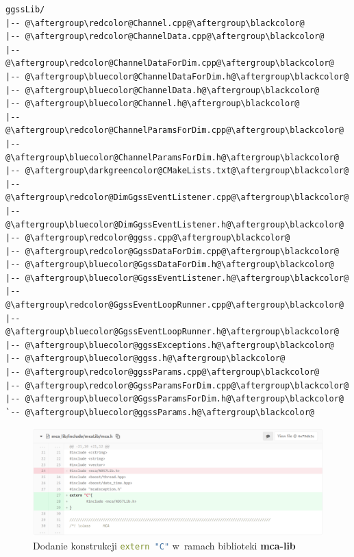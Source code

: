 \begin{multicols*}{2}[]
\begin{lstlisting}[title={(b) Pierwotna struktura biblioteki \textbf{ggss-lib}}, label={lst:oldLibStructure}, escapechar=@]
ggssLib/
|-- @\aftergroup\redcolor@Channel.cpp@\aftergroup\blackcolor@
|-- @\aftergroup\redcolor@ChannelData.cpp@\aftergroup\blackcolor@
|-- @\aftergroup\redcolor@ChannelDataForDim.cpp@\aftergroup\blackcolor@
|-- @\aftergroup\bluecolor@ChannelDataForDim.h@\aftergroup\blackcolor@
|-- @\aftergroup\bluecolor@ChannelData.h@\aftergroup\blackcolor@
|-- @\aftergroup\bluecolor@Channel.h@\aftergroup\blackcolor@
|-- @\aftergroup\redcolor@ChannelParamsForDim.cpp@\aftergroup\blackcolor@
|-- @\aftergroup\bluecolor@ChannelParamsForDim.h@\aftergroup\blackcolor@
|-- @\aftergroup\darkgreencolor@CMakeLists.txt@\aftergroup\blackcolor@
|-- @\aftergroup\redcolor@DimGgssEventListener.cpp@\aftergroup\blackcolor@
|-- @\aftergroup\bluecolor@DimGgssEventListener.h@\aftergroup\blackcolor@
|-- @\aftergroup\redcolor@ggss.cpp@\aftergroup\blackcolor@
|-- @\aftergroup\redcolor@GgssDataForDim.cpp@\aftergroup\blackcolor@
|-- @\aftergroup\bluecolor@GgssDataForDim.h@\aftergroup\blackcolor@
|-- @\aftergroup\bluecolor@GgssEventListener.h@\aftergroup\blackcolor@
|-- @\aftergroup\redcolor@GgssEventLoopRunner.cpp@\aftergroup\blackcolor@
|-- @\aftergroup\bluecolor@GgssEventLoopRunner.h@\aftergroup\blackcolor@
|-- @\aftergroup\bluecolor@ggssExceptions.h@\aftergroup\blackcolor@
|-- @\aftergroup\bluecolor@ggss.h@\aftergroup\blackcolor@
|-- @\aftergroup\redcolor@ggssParams.cpp@\aftergroup\blackcolor@
|-- @\aftergroup\redcolor@GgssParamsForDim.cpp@\aftergroup\blackcolor@
|-- @\aftergroup\bluecolor@GgssParamsForDim.h@\aftergroup\blackcolor@
`-- @\aftergroup\bluecolor@ggssParams.h@\aftergroup\blackcolor@
\end{lstlisting}

\end{multicols*}

\newpage

\begin{figure}
\includegraphics[width=\textwidth]{res/png/addExternC}
\caption{Dodanie konstrukcji \lstinline[language=c++]{extern "C"} w~ramach biblioteki \textbf{mca-lib}}
\label{fig:addExternC}
\end{figure}

